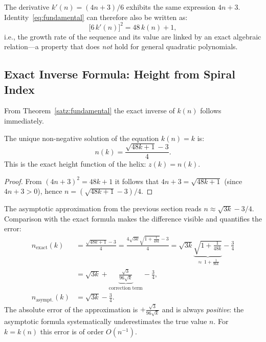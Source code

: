 \begin{bemerkung}
The derivative $k'(n) = (4n+3)/6$ exhibits the same expression $4n+3$.
Identity~\eqref{eq:fundamental} can therefore also be written as:
\[
  \bigl[6\,k'(n)\bigr]^2 = 48\,k(n) + 1,
\]
i.e., the growth rate of the sequence and its value are linked by an exact
algebraic relation---a property that does \emph{not} hold for general
quadratic polynomials.
\end{bemerkung}

\subsection{Exact Inverse Formula: Height from Spiral Index}
\label{subsec:umkehrformel}

From Theorem~\ref{satz:fundamental} the exact inverse of $k(n)$
follows immediately.

\begin{satz}\label{satz:hoehenfunktion}
The unique non-negative solution of the equation $k(n) = k$ is:
\begin{equation}\label{eq:n_von_k}
  \boxed{n(k) = \frac{\sqrt{48k + 1} - 3}{4}.}
\end{equation}
This is the exact height function of the helix: $z(k) = n(k)$.
\end{satz}

\begin{proof}
From $(4n+3)^2 = 48k+1$ it follows that $4n+3 = \sqrt{48k+1}$ (since $4n+3 > 0$),
hence $n = (\sqrt{48k+1}-3)/4$.
\end{proof}

\begin{bemerkung}
\label{bem:vergleich}
The asymptotic approximation from the previous section reads
$n \approx \sqrt{3k} - 3/4$. Comparison with the exact formula
makes the difference visible and quantifies the error:
\begin{align*}
  n_{\mathrm{exact}}(k)
  &= \frac{\sqrt{48k+1}-3}{4}
   = \frac{4\sqrt{3k}\sqrt{1+\frac{1}{48k}}-3}{4}
   = \sqrt{3k}\underbrace{\sqrt{1+\frac{1}{48k}}}_{\approx\,1+\frac{1}{96k}}
     - \frac{3}{4} \\
  &= \sqrt{3k} + \underbrace{\frac{\sqrt{3}}{96\sqrt{k}}}_{\text{correction term}}
     - \frac{3}{4}, \\[6pt]
  n_{\mathrm{asympt.}}(k)
  &= \sqrt{3k} - \frac{3}{4}.
\end{align*}
The absolute error of the approximation is $+\tfrac{\sqrt{3}}{96\sqrt{k}}$
and is always \emph{positive}: the asymptotic formula systematically
underestimates the true value $n$. For $k = k(n)$ this error is of
order $O(n^{-1})$.
\end{bemerkung}

